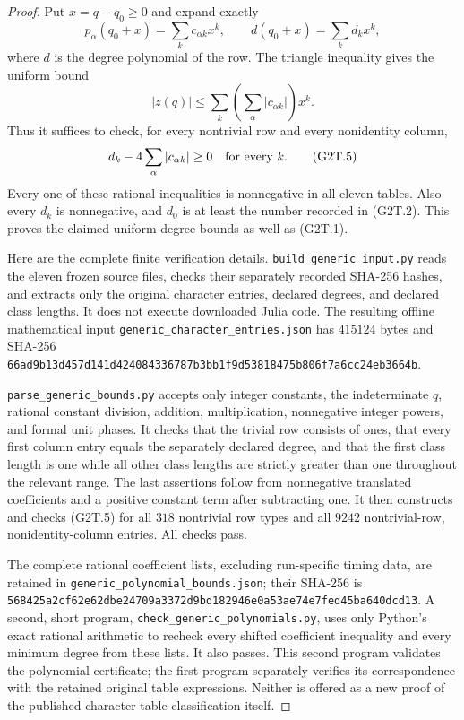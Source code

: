 \begin{proof}
Put $x=q-q_0\ge0$ and expand exactly
\[
 p_\alpha(q_0+x)=\sum_k c_{\alpha k}x^k,
 \qquad d(q_0+x)=\sum_k d_kx^k,
\]
where $d$ is the degree polynomial of the row.  The triangle inequality
gives the uniform bound
\[
                 |z(q)|\le
                 \sum_k\left(\sum_\alpha|c_{\alpha k}|\right)x^k.
                                                               \tag{G2T.4}
\]
Thus it suffices to check, for every nontrivial row and every
nonidentity column,
\[
                  d_k-4\sum_\alpha|c_{\alpha k}|\ge0
                         \quad\hbox{for every }k.           \tag{G2T.5}
\]
Every one of these rational inequalities is nonnegative in all
eleven tables.  Also every $d_k$ is nonnegative, and $d_0$ is at
least the number recorded in (G2T.2).  This proves the claimed
uniform degree bounds as well as (G2T.1).

Here are the complete finite verification details.
\texttt{build\_generic\_input.py} reads the eleven frozen source
files, checks their separately recorded SHA-256 hashes, and
extracts only the original character entries, declared degrees,
and declared class lengths.  It does not execute downloaded
Julia code.  The resulting offline mathematical input
\texttt{generic\_character\_entries.json} has $415124$ bytes and
SHA-256
\texttt{66ad9b13d457d141d424084336787b3bb1f9d53818475b806f7a6cc24eb3664b}.

\texttt{parse\_generic\_bounds.py} accepts only integer constants,
the indeterminate $q$, rational constant division, addition,
multiplication, nonnegative integer powers, and formal unit phases.
It checks that the trivial row consists of ones, that every first
column entry equals the separately declared degree, and that the
first class length is one while all other class lengths are
strictly greater than one throughout the relevant range.  The
last assertions follow from nonnegative translated coefficients
and a positive constant term after subtracting one.
It then constructs and checks (G2T.5) for all $318$ nontrivial
row types and all $9242$ nontrivial-row, nonidentity-column
entries.  All checks pass.

The complete rational coefficient lists, excluding run-specific timing
data, are retained in
\texttt{generic\_polynomial\_bounds.json}; their SHA-256 is
\texttt{568425a2cf62e62dbe24709a3372d9bd182946e0a53ae74e7fed45ba640dcd13}.
A second, short program, \texttt{check\_generic\_polynomials.py},
uses only Python's exact rational arithmetic to recheck every
shifted coefficient inequality and every minimum degree from
these lists.  It also passes.  This second program validates
the polynomial certificate; the first program separately
verifies its correspondence with the retained original table
expressions.  Neither is offered as a new proof of the published
character-table classification itself.
\end{proof}

